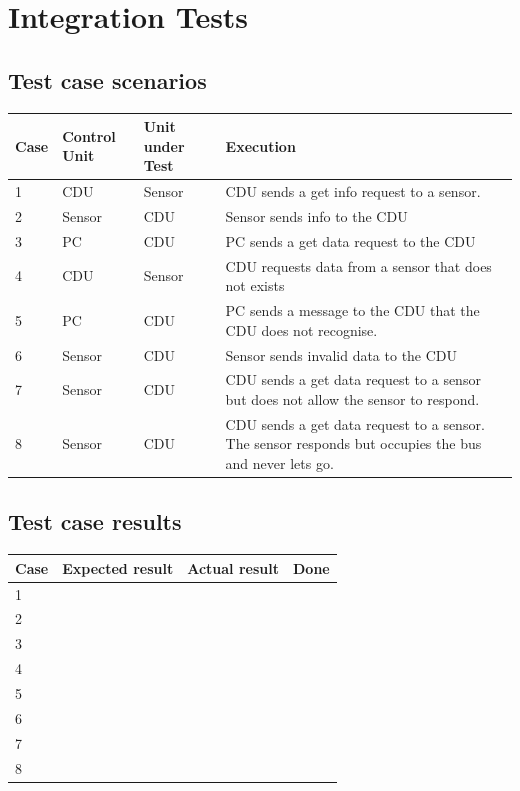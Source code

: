 \chapter{Integration Tests}

\section{Test case scenarios}
\begin{table}[H]
    \begin{tabular}{|l|l|l|p{10cm}|}
    \hline
    Case & Control Unit & Unit under Test & Execution \\ \hline
    1 & CDU & Sensor & CDU sends a get info request to a sensor. \\ \hline
    2 & Sensor & CDU & Sensor sends info to the CDU \\ \hline
    3 & PC & CDU & PC sends a get data request to the CDU \\ \hline
    4 & CDU & Sensor & CDU requests data from a sensor that does not exists \\ \hline
    5 & PC & CDU & PC sends a message to the CDU that the CDU does not recognise. \\ \hline
    6 & Sensor & CDU & Sensor sends invalid data to the CDU \\ \hline
    7 & Sensor & CDU & CDU sends a get data request to a sensor but does not allow the sensor to respond. \\ \hline
    8 & Sensor & CDU & CDU sends a get data request to a sensor. The sensor responds but occupies the bus and never lets go. \\ \hline
    \end{tabular}
\end{table}

\section{Test case results}
\begin{table}[H]
    \begin{tabular}{|l|l|l|p{10cm}|}
    \hline
    Case & Expected result & Actual result & Done \\ \hline
    1 & ~ & ~ & ~\\ \hline
    2 & ~ & ~ & ~\\ \hline
    3 & ~ & ~ & ~\\ \hline
    4 & ~ & ~ & ~\\ \hline
    5 & ~ & ~ & ~\\ \hline
    6 & ~ & ~ & ~\\ \hline
    7 & ~ & ~ & ~\\ \hline
    8 & ~ & ~ & ~\\ \hline
    \end{tabular}
\end{table}

